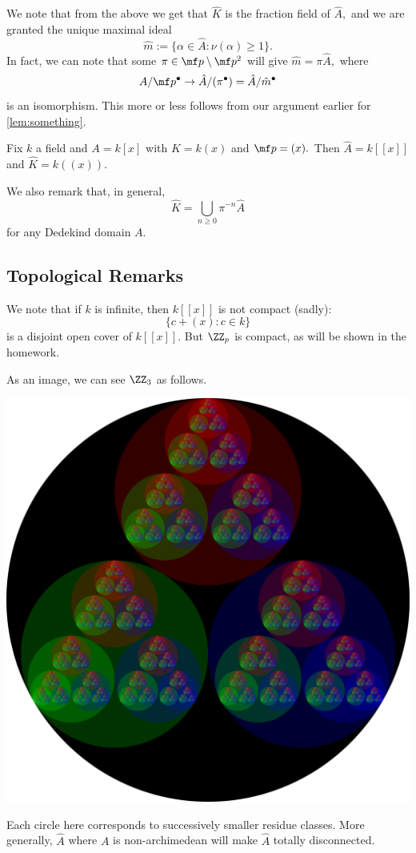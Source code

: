 We note that from the above we get that $\hat K$ is the fraction field of $\hat A,$ and we are granted the unique maximal ideal
\[\hat m:=\{\alpha\in\hat A:\nu(\alpha)\ge1\}.\]
In fact, we can note that some $\pi\in\mf p\setminus\mf p^2$ will give $\hat m=\pi\hat A,$ where
\[A/\mf p^\bullet\to\hat A/(\pi^\bullet)=\hat A/\hat m^\bullet\]
is an isomorphism. This more or less follows from our argument earlier for \autoref{lem:something}. 
\begin{example}
	Fix $k$ a field and $A=k[x]$ with $K=k(x)$ and $\mf p=(x).$ Then $\hat A=k[[x]]$ and $\hat K=k((x)).$
\end{example}
We also remark that, in general,
\[\hat K=\bigcup_{n\ge 0}\pi^{-n}\hat A\]
for any Dedekind domain $A.$

\subsection{Topological Remarks}
We note that if $k$ is infinite, then $k[[x]]$ is not compact (sadly):
\[\{c+(x):c\in k\}\]
is a disjoint open cover of $k[[x]].$ But $\ZZ_p$ is compact, as will be shown in the homework.

As an image, we can see $\ZZ_3$ as follows.
\begin{center}
	\includegraphics[scale=0.1]{./3-adics-dark.png}
\end{center}
Each circle here corresponds to successively smaller residue classes. More generally, $\hat A$ where $A$ is non-archimedean will make $\hat A$ totally disconnected.

